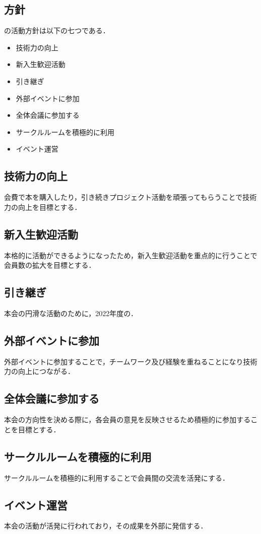 \subsection*{\newGradeIfKouki{}\secondGrade{}方針}


\secondGrade{}の活動方針は以下の七つである．

\begin{itemize}
    \item 技術力の向上
    \item 新入生歓迎活動   
    \item 引き継ぎ
    \item 外部イベントに参加
    \item 全体会議に参加する
    \item サークルルームを積極的に利用
    \item イベント運営
\end{itemize}

\subsection*{技術力の向上}
会費で本を購入したり，引き続きプロジェクト活動を頑張ってもらうことで技術力の向上を目標とする．

\subsection*{新入生歓迎活動}
本格的に活動ができるようになったため，新入生歓迎活動を重点的に行うことで会員数の拡大を目標とする．

\subsection*{引き継ぎ}
本会の円滑な活動のために，2022年度の．

\subsection*{外部イベントに参加}
外部イベントに参加することで，チームワーク及び経験を重ねることになり技術力の向上につながる．

\subsection*{全体会議に参加する}
本会の方向性を決める際に，各会員の意見を反映させるため積極的に参加することを目標とする．

\subsection*{サークルルームを積極的に利用}
サークルルームを積極的に利用することで会員間の交流を活発にする．

\subsection*{イベント運営}
本会の活動が活発に行われており，その成果を外部に発信する．
